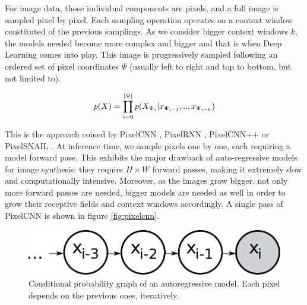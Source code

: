 For image data, those individual components are pixels, and a full image is sampled pixel by pixel. Each sampling operation operates on a context window constituted of the previous samplings. As we consider bigger context windows $k$, the models needed become more complex and bigger and that is when Deep Learning comes into play. This image is progressively sampled following an ordered set of pixel coordinates $\Psi$ (usually left to right and top to bottom, but not limited to).

\begin{equation}
    p(X) = \prod_{i = 0}^{|\Psi|} p(X_{\Psi_i} | x_{\Psi_{i-1}}, .., x_{\Psi_{i-k}})
\end{equation}

This is the approach coined by PixelCNN \citep{pixelcnn}, PixelRNN \citep{pixelrnn}, PixelCNN++ \citep{pixelcnn++} or PixelSNAIL \citep{pixelsnail}. At inference time, we sample pixels one by one, each requiring a model forward pass. This exhibits the major drawback of auto-regressive models for image synthesis: they require $H \times W$ forward passes, making it extremely slow and computationally intensive. Moreover, as the images grow bigger, not only more forward passes are needed, bigger models are needed as well in order to grow their receptive fields and context windows accordingly. A single pass of PixelCNN is shown in figure \ref{fig:pixelcnn}.

\begin{figure}[ht]
    \centering
    \includegraphics[scale=0.5]{60-files/chain-pixelcnn.pdf}
    \caption{Conditional probability graph of an autoregressive model. Each pixel depends on the previous ones, iteratively.}
    \label{fig:autoreg-chain}
\end{figure}

